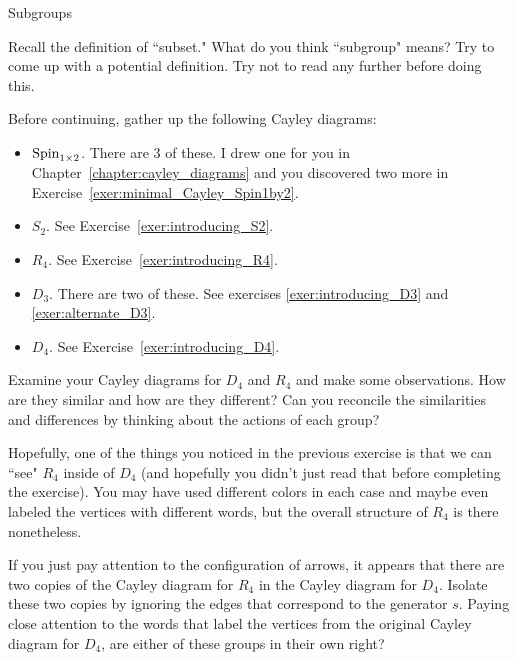 \begin{section}{Subgroups}\label{sec:intuitive_subgroups}

\begin{exercise}
Recall the definition of ``subset."  What do you think ``subgroup" means?  Try to come up with a potential definition.  Try not to read any further before doing this.
\end{exercise}

Before continuing, gather up the following Cayley diagrams:
\begin{itemize}
\item $\operatorname{Spin}_{1\times 2}$. There are 3 of these.  I drew one for you in Chapter~\ref{chapter:cayley_diagrams} and you discovered two more in Exercise~\ref{exer:minimal_Cayley_Spin1by2}.
\item $S_2$.  See Exercise~\ref{exer:introducing_S2}.
\item $R_4$.  See Exercise~\ref{exer:introducing_R4}.
\item $D_3$.  There are two of these.  See exercises \ref{exer:introducing_D3} and \ref{exer:alternate_D3}.
\item $D_4$.  See Exercise~\ref{exer:introducing_D4}.
\end{itemize}

\begin{exercise}\label{exer:R4_in_D4}
Examine your Cayley diagrams for $D_4$ and $R_4$ and make some observations.  How are they similar and how are they different?  Can you reconcile the similarities and differences by thinking about the actions of each group?
\end{exercise}

Hopefully, one of the things you noticed in the previous exercise is that we can ``see" $R_4$ inside of $D_4$ (and hopefully you didn't just read that before completing the exercise).  You may have used different colors in each case and maybe even labeled the vertices with different words, but the overall structure of $R_4$ is there nonetheless.

\begin{exercise}\label{exer:R4_subgroup_D_4}
If you just pay attention to the configuration of arrows, it appears that there are two copies of the Cayley diagram for $R_4$ in the Cayley diagram for $D_4$.  Isolate these two copies by ignoring the edges that correspond to the generator $s$.  Paying close attention to the words that label the vertices from the original Cayley diagram for $D_4$, are either of these groups in their own right?
\end{exercise}


\end{section}
